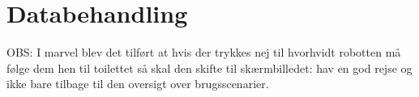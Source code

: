 \chapter{Databehandling}
\label{TestAfSkalaDatabehandling}
%
OBS: I marvel blev det tilført at hvis der trykkes nej til hvorhvidt robotten må følge dem hen til toilettet så skal den skifte til skærmbilledet: hav en god rejse og ikke bare tilbage til den oversigt over brugsscenarier.